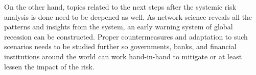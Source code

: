 \documentclass[a4paper,11pt]{article}
\begin{document}
On the other hand, topics related to the next steps after the systemic risk analysis is done need to be deepened as well. As network science reveals all the patterns and insights from the system, an early warning system of global recession can be constructed. Proper countermeasures and adaptation to such scenarios needs to be studied further so governments, banks, and financial institutions around the world can work hand-in-hand to mitigate or at least lessen the impact of the risk.




\small
\end{document}
